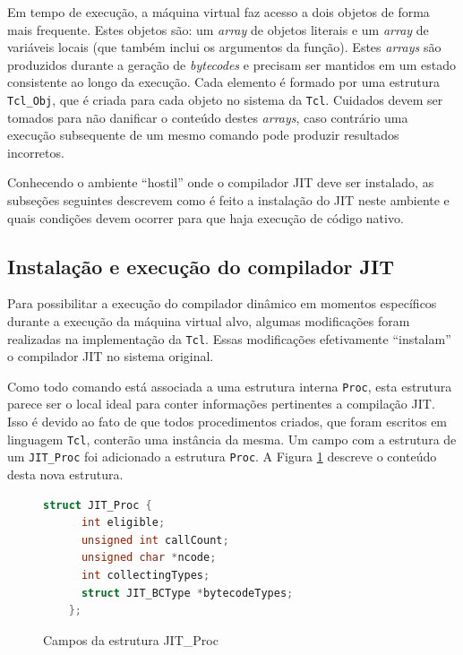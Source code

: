
Em tempo de execução, a máquina virtual faz acesso a dois objetos de
forma mais frequente. Estes objetos são: um \textit{array} de objetos
literais e um \textit{array} de variáveis locais (que também inclui os
argumentos da função). Estes \textit{arrays} são produzidos durante a
geração de \textit{bytecodes} e precisam ser mantidos em um estado
consistente ao longo da execução.
Cada elemento é formado por uma estrutura \verb!Tcl_Obj!,
que é criada para cada objeto no sistema da \texttt{Tcl}. Cuidados
devem ser tomados para não danificar o conteúdo destes
\textit{arrays}, caso contrário uma execução subsequente de um mesmo
comando pode produzir resultados incorretos.

Conhecendo o ambiente ``hostil'' onde o compilador JIT deve ser
instalado, as subseções seguintes descrevem como é feito a instalação do
JIT neste ambiente e quais condições devem ocorrer para que haja
execução de código nativo.

\subsection{Instalação e execução do compilador JIT}
\label{install-exec2}
Para possibilitar a execução do compilador dinâmico em momentos
específicos durante a execução da máquina virtual alvo, algumas
modificações foram realizadas na implementação da
\texttt{Tcl}. Essas modificações efetivamente ``instalam'' o
compilador JIT no sistema original.

Como todo comando está associada a uma estrutura interna \verb!Proc!,
esta estrutura parece ser o local ideal para conter informações
pertinentes a compilação JIT. Isso é devido ao fato de que todos procedimentos
criados, que foram escritos em linguagem \texttt{Tcl}, conterão uma
instância da mesma. Um campo com a estrutura de um
\verb!JIT_Proc! foi adicionado a estrutura \verb!Proc!. A Figura
\ref{jitproc} descreve o conteúdo desta nova estrutura.

\begin{figure}[h]
  \centering
  \begin{lstlisting}[language=C]
    struct JIT_Proc {
      int eligible;
      unsigned int callCount;
      unsigned char *ncode;
      int collectingTypes;
      struct JIT_BCType *bytecodeTypes;
    };
  \end{lstlisting}
  \caption{Campos da estrutura JIT\_Proc\label{jitproc}}
\end{figure}

